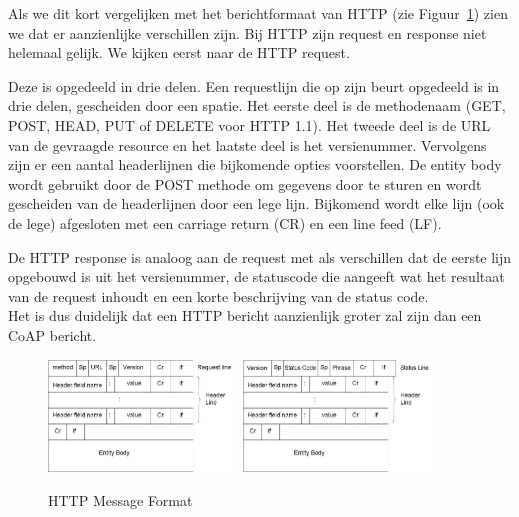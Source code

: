 Als we dit kort vergelijken met het berichtformaat van HTTP (zie Figuur~\ref{fig:HTTPMessageFormat}) zien we dat er aanzienlijke verschillen zijn. Bij HTTP zijn request en response niet helemaal gelijk. We kijken eerst naar de HTTP request.

Deze is opgedeeld in drie delen. Een requestlijn die op zijn beurt opgedeeld is in drie delen, gescheiden door een spatie. Het eerste deel is de methodenaam (GET, POST, HEAD, PUT of DELETE voor HTTP 1.1). Het tweede deel is de URL van de gevraagde resource en het laatste deel is het versienummer. Vervolgens zijn er een aantal headerlijnen die bijkomende opties voorstellen. De entity body wordt gebruikt door de POST methode om gegevens door te sturen en wordt gescheiden van de headerlijnen door een lege lijn. Bijkomend wordt elke lijn (ook de lege) afgesloten met een carriage return (CR) en een line feed (LF).

De HTTP response is analoog aan de request met als verschillen dat de eerste lijn opgebouwd is uit het versienummer, de statuscode die aangeeft wat het resultaat van de request inhoudt en een korte beschrijving van de status code.\\
Het is dus duidelijk dat een HTTP bericht aanzienlijk groter zal zijn dan een CoAP bericht.

\begin{figure}[h]
\vspace{10pt}
\centering
{}
{\includegraphics[width=0.45\textwidth]{fig/HTTPRequestMessageFormat}}
{\includegraphics[width=0.45\textwidth]{fig/HTTPResponseMessageFormat}}
\caption{HTTP Message Format}\label{fig:HTTPMessageFormat}
\end{figure}

